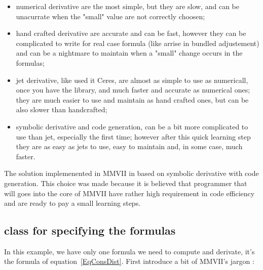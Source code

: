 \begin{itemize}
    \item numerical derivative are the most simple, but they are slow, and can be unacurrate
          when the "small" value are not correctly choosen;

    \item hand crafted derivative are accurate and can be fast, however they can be complicated
          to write for real case formula (like arrise in bundled adjustement) and can be
          a nightmare to maintain when a "small" change occurs in the formulas;

    \item jet derivative, like used it Ceres, are almost as simple to use as numericall, once
          you have the library,  and much faster and accurate as numerical ones; they are much
          easier to use and maintain as  hand crafted ones, but can be also slower than
          handcrafted;

    \item symbolic derivative and code generation, can be a bit more complicated to use
          than jet, especially the first time; however after  this quick learning step
          they are as easy as jets to use,  easy to maintain and, in some case, much
          faster.
\end{itemize}

The solution implemenented in MMVII in based on symbolic derivative with code generation.
This choice was made because it is believed that programmer that will goes into the
core of MMVII have rather high requirement in code efficiency and are ready to pay a
small learning steps.



\subsection{class for specifying the formulas}

\label{Class:Specif:Formulas}

In this  example, we have only one formula we need to compute and derivate, it's
the formula of equation~\ref{EqConsDist}.  First introduce a bit of MMVII's jargon  :

